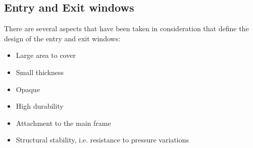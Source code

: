  
 
 
\subsection {Entry and Exit windows}

\indent There are several aspects that have been taken in consideration that define the design of the entry and exit windows:

\begin{itemize}
    \item Large area to cover
    \item Small thickness
    \item Opaque
    \item High durability
    \item Attachment to the main frame
    \item Structural stability, i.e. resistance to pressure variations
    \end{itemize}

